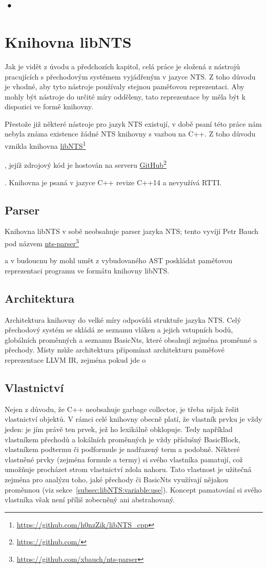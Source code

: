 \documentclass[10pt,a4paper,notitlepage]{report}
\newcommand\fnurl[2]{%
  \href{#2}{#1}\footnote{\url{#2}}%
}
\begin{document}
\subsection{•}

\section{Knihovna libNTS}
Jak je vidět z úvodu a předchozích kapitol, celá práce je složená z nástrojů pracujících s přechodovým systémem vyjádřeným v jazyce NTS. Z toho důvodu je vhodné, aby tyto nástroje používaly stejnou paměťovou reprezentaci. Aby mohly být nástroje do určité míry odděleny, tato reprezentace by měla být k dispozici ve formě knihovny.

Přestože již některé nástroje pro jazyk NTS existují, v době psaní této práce nám nebyla známa existence žádné NTS knihovny s vazbou na C++. Z toho důvodu vznikla knihovna
\fnurl{libNTS}{https://github.com/h0nzZik/libNTS_cpp}
, jejíž zdrojový kód je hostován na serveru
\fnurl{GitHub}{https://github.com/}
. Knihovna je psaná v jazyce C++ revize C++14 a nevyužívá RTTI.

\subsection{Parser}
Knihovna libNTS v sobě neobsahuje parser jazyka NTS; tento vyvíjí Petr Bauch pod názvem
\fnurl{nts-parser}{https://github.com/xbauch/nts-parser}
a v budoucnu by mohl umět z vybudovaného AST poskládat paměťovou reprezentaci programu ve formátu knihovny libNTS.

\subsection{Architektura}
Architektura knihovny do velké míry odpovídá struktuře jazyka NTS. Celý přechodový systém se skládá ze seznamu vláken a jejich vstupních bodů, globálních proměnných a seznamu BasicNts, které obsahují zejména proměnné a přechody. Místy může architektura připomínat architekturu paměťové reprezentace LLVM IR, zejména pokud jde o 

\subsection{Vlastnictví}
\label{subsec:libNTS:ownership}
Nejen z důvodu, že C++ neobsahuje garbage collector, je třeba nějak řešit vlastnictví objektů. V rámci celé knihovny obecně platí, že vlastník prvku je vždy jeden: je jím právě ten prvek, jež ho lexikálně obklopuje. Tedy například vlastníkem přechodů a lokálních proměnných je vždy příslušný BasicBlock, vlastníkem podtermu či podformule je nadřazený term a podobně. Některé vlastněné prvky (zejména formule a termy) si svého vlastníka pamatují, což umožňuje procházet strom vlastnictví zdola nahoru. Tato vlastnost je užitečná zejména pro analýzu toho, jaké přechody či BasicNts využívají nějakou proměnnou (viz sekce~\ref{subsec:libNTS:variable:use}). Koncept pamatování si svého vlastníka však není příliš zobecněný ani abstrahovaný.
\end{document}

